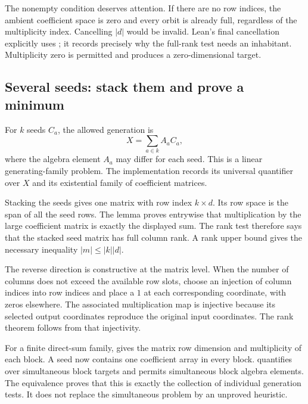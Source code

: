 
The nonempty condition deserves attention. If there are no row indices, the ambient coefficient space is zero and every orbit is already full, regardless of the multiplicity index. Cancelling $|d|$ would be invalid. Lean's final cancellation explicitly uses ; it records precisely why the full-rank test needs an inhabitant. Multiplicity zero is permitted and produces a zero-dimensional target.

\subsection{Several seeds: stack them and prove a minimum}
For $k$ seeds $C_a$, the allowed generation is
\[
X=\sum_{a\in k}A_aC_a,
\]
where the algebra element $A_a$ may differ for each seed. This is a linear generating-family problem. The implementation records its universal quantifier over $X$ and its existential family of coefficient matrices.


Stacking the seeds gives one matrix with row index $k\times d$. Its row space is the span of all the seed rows. The lemma  proves entrywise that multiplication by the large coefficient matrix is exactly the displayed sum. The rank test therefore says that the stacked seed matrix has full column rank. A rank upper bound gives the necessary inequality $|m|\le |k||d|$.

The reverse direction is constructive at the matrix level. When the number of columns does not exceed the available row slots, choose an injection of column indices into row indices and place a $1$ at each corresponding coordinate, with zeros elsewhere. The associated multiplication map is injective because its selected output coordinates reproduce the original input coordinates. The rank theorem follows from that injectivity.


For a finite direct-sum family,  gives the matrix row dimension and multiplicity of each block. A seed now contains one coefficient array in every block.  quantifies over simultaneous block targets and permits simultaneous block algebra elements. The equivalence  proves that this is exactly the collection of individual generation tests. It does not replace the simultaneous problem by an unproved heuristic.


